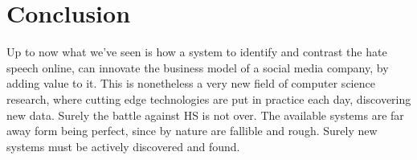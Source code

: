 \section{Conclusion}

Up to now what we've seen is how a system to identify and contrast the
hate speech online, can innovate the business model of a social media
company, by adding value to it. This is nonetheless a very new field
of computer science research, where cutting edge technologies are put
in practice each day, discovering new data. Surely the battle against
HS is not over. The available systems are far away form being perfect,
since by nature are fallible and rough. Surely new systems must be
actively discovered and found.

